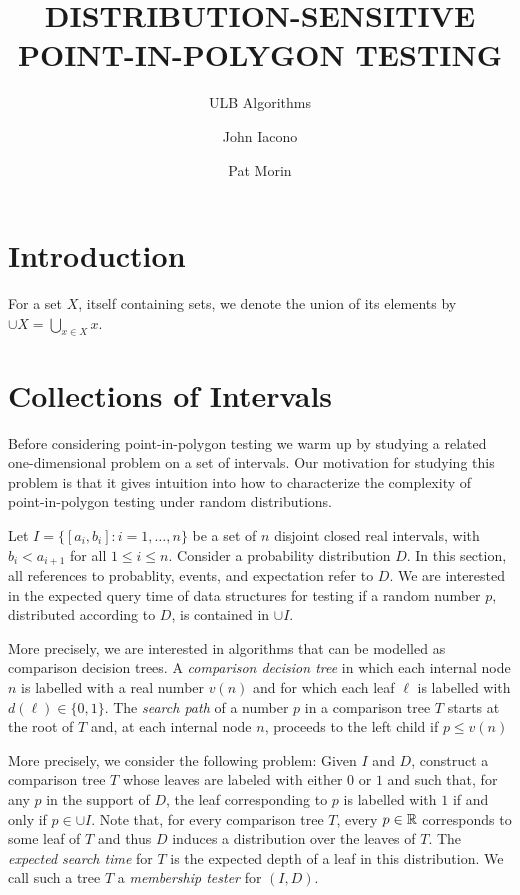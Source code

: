 \documentclass[charterfonts,lotsofwhite]{patmorin}
\title{\MakeUppercase{Distribution-Sensitive Point-in-Polygon Testing}}
\author{ULB Algorithms \and John Iacono \and Pat Morin}
\date{}
\begin{document}
\maketitle

\section{Introduction}


For a set $X$, itself containing sets, we denote the union of its
elements by $\cup X=\bigcup_{x\in X} x$.

\section{Collections of Intervals}

Before considering point-in-polygon testing we warm up by studying a
related one-dimensional problem on a set of intervals.  Our motivation
for studying this problem is that it gives intuition into how to
characterize the complexity of point-in-polygon testing under random
distributions.

Let $I=\{[a_i,b_i]: i=1,\ldots,n\}$ be a set of $n$ disjoint closed
real intervals, with $b_i < a_{i+1}$ for all $1\le i\le n$.  Consider
a probability distribution $D$.  In this section, all references to
probablity, events, and expectation refer to $D$. We are interested in
the expected query time of data structures for testing if a random
number $p$, distributed according to $D$, is contained in $\cup I$.

More precisely, we are interested in algorithms that can be modelled
as comparison decision trees.  A \emph{comparison decision tree} in
which each internal node $n$ is labelled with a real number $v(n)$ and
for which each leaf $\ell$ is labelled with $d(\ell)\in\{0,1\}$.  The
\emph{search path} of a number $p$ in a comparison tree $T$ starts at
the root of $T$ and, at each internal node $n$, proceeds to the left child
if $p\le v(n)$



More precisely, we consider the following problem:  Given $I$
and $D$, construct a comparison tree $T$ whose leaves are labeled with
either $0$ or $1$ and such that, for any $p$ in the support of $D$,
the leaf corresponding to $p$ is labelled with $1$ if and only if
$p\in \cup I$.  Note that, for every comparison tree $T$, every
$p\in\mathbb{R}$ corresponds to some leaf of $T$ and thus $D$ induces a
distribution over the leaves of $T$.  The \emph{expected search time}
for $T$ is the expected depth of a leaf in this distribution.  We call
such a tree $T$ a \emph{membership tester} for $(I,D)$.
\end{document}
